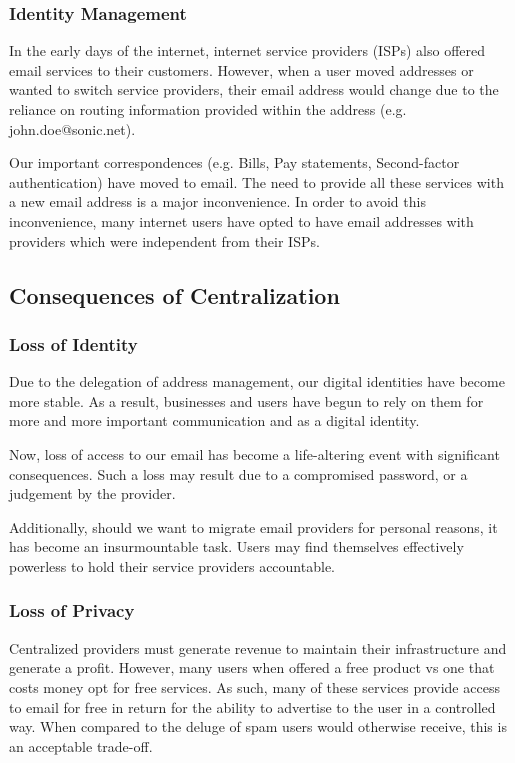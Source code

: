 \documentclass{article}
\begin{document}
\subsubsection{Identity Management}

In the early days of the internet, internet service providers (ISPs) also offered email services to their customers. However, when a user moved addresses or wanted to switch service providers, their email address would change due to the reliance on routing information provided within the address (e.g. john.doe@sonic.net). 

Our important correspondences (e.g. Bills, Pay statements, Second-factor authentication) have moved to email. The need to provide all these services with a new email address is a major inconvenience. In order to avoid this inconvenience, many internet users have opted to have email addresses with providers which were independent from their ISPs.

\subsection{Consequences of Centralization}


\subsubsection{Loss of Identity}

Due to the delegation of address management, our digital identities have become more stable. As a result, businesses and users have begun to rely on them for more and more important communication and as a digital identity.

Now, loss of access to our email has become a life-altering event with significant consequences. Such a loss may result due to a compromised password, or a judgement by the provider. 

Additionally, should we want to migrate email providers for personal reasons, it has become an insurmountable task. Users may find themselves effectively powerless to hold their service providers accountable.

\subsubsection{Loss of Privacy}

Centralized providers must generate revenue to maintain their infrastructure and generate a profit. However, many users when offered a free product vs one that costs money opt for free services. As such, many of these services provide access to email for free in return for the ability to advertise to the user in a controlled way. When compared to the deluge of spam users would otherwise receive, this is an acceptable trade-off.
\end{document}
